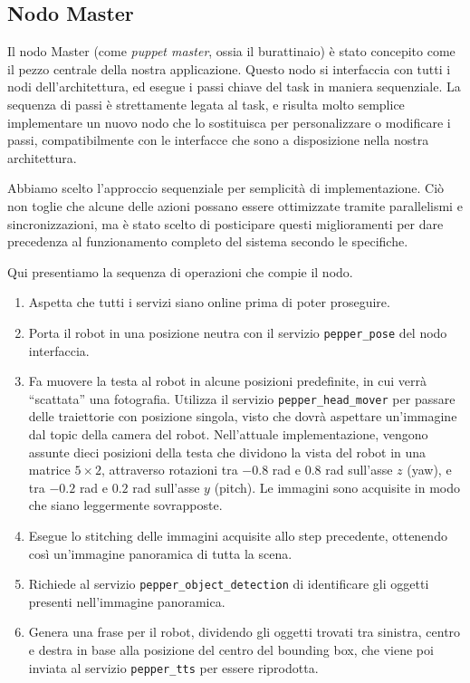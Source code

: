 \subsection{Nodo Master}

Il nodo Master (come \emph{puppet master}, ossia il burattinaio) è stato concepito come il pezzo centrale della nostra applicazione. Questo nodo si interfaccia con tutti i nodi dell'architettura, ed esegue i passi chiave del task in maniera sequenziale. La sequenza di passi è strettamente legata al task, e risulta molto semplice implementare un nuovo nodo che lo sostituisca per personalizzare o modificare i passi, compatibilmente con le interfacce che sono a disposizione nella nostra architettura.

Abbiamo scelto l'approccio sequenziale per semplicità di implementazione. Ciò non toglie che alcune delle azioni possano essere ottimizzate tramite parallelismi e sincronizzazioni, ma è stato scelto di posticipare questi miglioramenti per dare precedenza al funzionamento completo del sistema secondo le specifiche.

Qui presentiamo la sequenza di operazioni che compie il nodo.
\begin{enumerate}
	\item Aspetta che tutti i servizi siano online prima di poter proseguire.
	\item Porta il robot in una posizione neutra con il servizio \verb|pepper_pose| del nodo interfaccia. 
	\item Fa muovere la testa al robot in alcune posizioni predefinite, in cui verrà ``scattata'' una fotografia. Utilizza il servizio \verb|pepper_head_mover| per passare delle traiettorie con posizione singola, visto che dovrà aspettare un'immagine dal topic della camera del robot. Nell'attuale implementazione, vengono assunte dieci posizioni della testa che dividono la vista del robot in una matrice $5 \times 2$, attraverso rotazioni tra $-0.8$ rad e $0.8$ rad sull'asse $z$ (yaw), e tra $-0.2$ rad e $0.2$ rad sull'asse $y$ (pitch). Le immagini sono acquisite in modo che siano leggermente sovrapposte.
	\item Esegue lo stitching delle immagini acquisite allo step precedente, ottenendo così un'immagine panoramica di tutta la scena.
	\item Richiede al servizio \verb|pepper_object_detection| di identificare gli oggetti presenti nell'immagine panoramica.
	\item Genera una frase per il robot, dividendo gli oggetti trovati tra sinistra, centro e destra in base alla posizione del centro del bounding box, che viene poi inviata al servizio \verb|pepper_tts| per essere riprodotta.
\end{enumerate}

